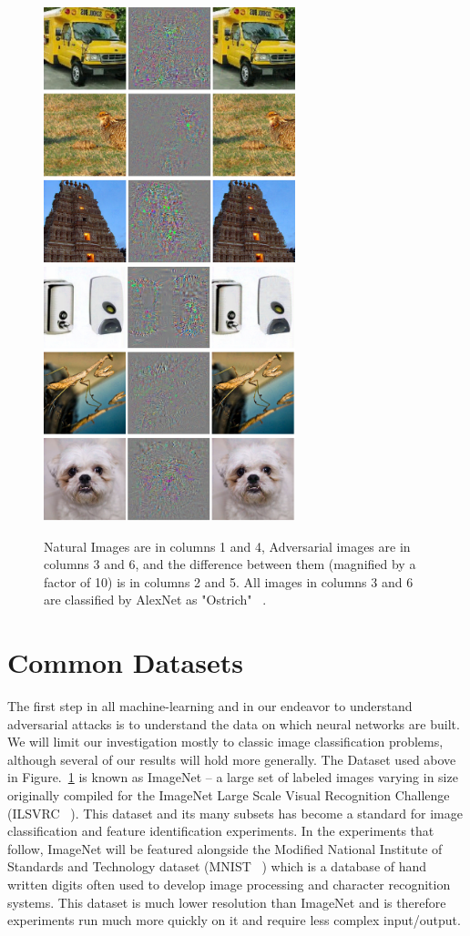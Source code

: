 \begin{figure}[H]
    \centering
\includegraphics[width=7.3cm]{c1_figures/negative1.png}\includegraphics[width=7.3cm]{c1_figures/negative2.png}
    \caption{Natural Images are in columns 1 and 4, Adversarial images are in columns 3 and 6, and the difference between them (magnified by a factor of 10) is in columns 2 and 5. All images in columns 3 and 6 are classified by AlexNet as "Ostrich" ~\citep{szegedy2013}.}
    \label{fig:szegedy}
\end{figure}

\section{Common Datasets}

The first step in all machine-learning and in our endeavor to
understand adversarial attacks is to understand the data on which
neural networks are built. We will limit our investigation mostly to
classic image classification problems, although several of our results
will hold more generally. The Dataset used above in
Figure.~\ref{fig:szegedy} is known as ImageNet -- a large set of
labeled images varying in size originally compiled for the ImageNet
Large Scale Visual Recognition Challenge (ILSVRC ~\citet{ILSVRC15}). This
dataset and its many subsets has become a standard for image
classification and feature identification experiments. In the
experiments that follow, ImageNet will be featured alongside the
Modified National Institute of Standards and Technology dataset (MNIST ~\citet{MNIST}) which is a database of hand written digits often used to develop image processing and character recognition systems. This dataset is much lower resolution than ImageNet and is therefore experiments run much more quickly on it and require less complex input/output.  

